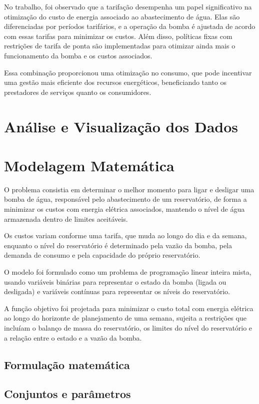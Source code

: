 No trabalho, foi observado que a tarifação desempenha um papel significativo na otimização do custo de energia associado ao abastecimento de água. Elas são diferenciadas por períodos tarifários, e a operação da bomba é ajustada de acordo com essas tarifas para minimizar os custos. Além disso, políticas fixas com restrições de tarifa de ponta são implementadas para otimizar ainda mais o funcionamento da bomba e os custos associados. 

Essa combinação proporcionou uma otimização no consumo, que pode incentivar uma gestão mais eficiente dos recursos energéticos, beneficiando tanto os prestadores de serviços quanto os consumidores. 

\section{Análise e Visualização dos Dados}
  

\section{Modelagem Matemática}

O problema consistia em determinar o melhor momento para ligar e desligar uma bomba de água, responsável pelo abastecimento de um reservatório, de forma a minimizar os custos com energia elétrica associados, mantendo o nível de água armazenada dentro de limites aceitáveis.

Os custos variam conforme uma tarifa, que muda ao longo do dia e da semana, enquanto o nível do reservatório é determinado pela vazão da bomba, pela demanda de consumo e pela capacidade do próprio reservatório.

O modelo foi formulado como um problema de programação linear inteira mista, usando variáveis binárias para representar o estado da bomba (ligada ou desligada) e variáveis contínuas para representar os níveis do reservatório.

A função objetivo foi projetada para minimizar o custo total com energia elétrica ao longo do horizonte de planejamento de uma semana, sujeita a restrições que incluíam o balanço de massa do reservatório, os limites do nível do reservatório e a relação entre o estado e a vazão da bomba.

\subsection{Formulação matemática}


\subsection{Conjuntos e parâmetros}

